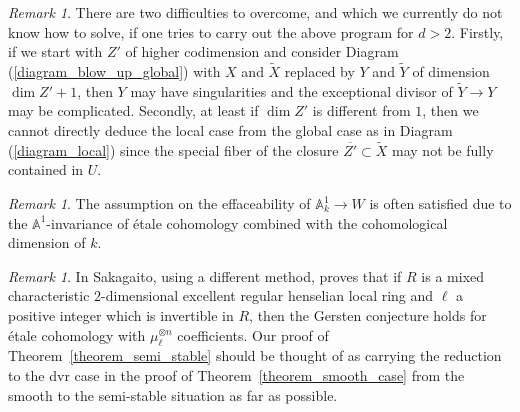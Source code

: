 \documentclass[11pt]{amsart}
\numberwithin{equation}{section}
\newtheorem{Key lemma}[theorem]{Key lemma}
\theoremstyle{definition}
\theoremstyle{remark}
\newtheorem{remark}[theorem]{Remark}
\newcommand{\bb}{\mathbb}
\renewcommand{\tilde}{\widetilde}
\begin{document}
\begin{remark}
There are two difficulties to overcome, and which we currently do not know how to solve, if one tries to carry out the above program for $d>2$. Firstly, if we start with $Z'$ of higher codimension and consider Diagram (\ref{diagram_blow_up_global}) with $X$ and $\tilde X$ replaced by $Y$ and $\tilde Y$ of dimension $\dim Z'+1$, then $Y$ may have singularities and the exceptional divisor of $\tilde{Y}\to Y$ may be complicated. Secondly, at least if $\dim Z'$ is different from $1$, then we cannot directly deduce the local case from the global case as in Diagram (\ref{diagram_local}) since the special fiber of the closure $\overline{Z'}\subset \tilde{X}$ may not be fully contained in $U$.
\end{remark}

\begin{remark}
The assumption on the effaceability of $\bb A^1_k\to W$ is often satisfied due to the $\bb A^1$-invariance of \'etale cohomology combined with the cohomological dimension of $k$.
\end{remark}

\begin{remark}
In \cite[Theorem 9]{Sakagaito2020} Sakagaito, using a different method, proves that if $R$ is a mixed characteristic $2$-dimensional excellent regular henselian local ring and $\ell$ a positive integer which  is invertible in $R$, then the Gersten conjecture holds for \'etale cohomology with $\mu_\ell^{\otimes n}$ coefficients. Our proof of Theorem~\ref{theorem_semi_stable} should be thought of as carrying the reduction to the dvr case in the proof of Theorem~\ref{theorem_smooth_case} from the smooth to the semi-stable situation as far as possible. 
\end{remark}



\newcommand{\etalchar}[1]{$^{#1}$}
\end{document}
